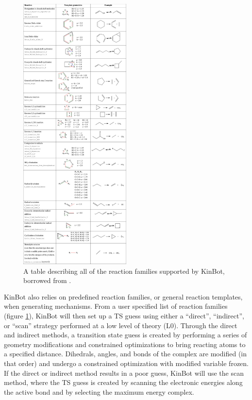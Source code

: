 \documentclass[preprint, 11pt]{elsarticle} %
\begin{document}
\begin{figure}
    \centering
    \includegraphics[width=0.5\textwidth]{kinbot_reactions.pdf}
    \caption{A table describing all of the reaction families supported by KinBot, borrowed from \cite{kinbot:2019}.}
    \label{fig:kinbot_families}
\end{figure}

KinBot also relies on predefined reaction families, or general reaction templates, when generating mechanisms. 
From a user specified list of reaction families (figure \ref{fig:kinbot_families}), KinBot will then set up a TS guess using either a ``direct'', ``indirect'', or ``scan'' strategy performed at a low level of theory (L0).
Through the direct and indirect methods, a transition state guess is created by performing a series of geometry modifications and constrained optimizations to bring reacting atoms to a specified distance. 
Dihedrals, angles, and bonds of the complex are modified (in that order) and undergo a constrained optimization with modified variable frozen.
If the direct or indirect method results in a poor guess, KinBot will use the scan method, where the TS guess is created by scanning the electronic energies along the active bond and by selecting the maximum energy complex.
\end{document}
